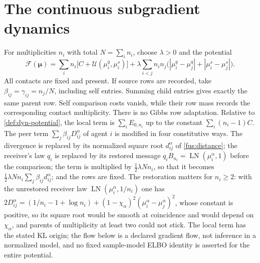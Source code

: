 \section{The continuous subgradient dynamics}
\label{sec:fus-dynamics}

For multiplicities $n_i$ with total $N=\sum_i n_i$, choose $\lambda>0$ and
the potential
\begin{equation}
 \mathcal F(\boldsymbol\mu)
 =\sum_i n_i\bigl[C+\mathcal U(\mu_i^q,\mu_i^s)\bigr]
 +\lambda\sum_{i<j}n_in_j
 \bigl(|\mu_i^q-\mu_j^q|+|\mu_i^s-\mu_j^s|\bigr).
 \label{fus:potential}
\end{equation}
All contacts are fixed and present. If source rows are recorded, take
$\beta_{ij}=\gamma_{ij}=n_j/N$, including self entries. Summing child
entries gives exactly the same parent row. Self comparison costs vanish,
while their row mass records the corresponding contact multiplicity.
There is no Gibbs row adaptation. Relative to \cref{def:dyn-potential},
the local term is $\sum_iE_{0,n_i}$ up to the constant $\sum_i(n_i-1)C$.
The peer term $\sum_j\beta_{ij}D_{ij}^\alpha$ of agent $i$ is modified in
four constitutive ways. The divergence is replaced by its normalized square
root $d_{ij}^\alpha$ of \cref{fus:distance}; the receiver's law $q_i$ is
replaced by its restored message $q_iB_{n_i}=\operatorname{LN}(\mu_i^\alpha,1)$
before the comparison; the term is multiplied by
$\tfrac12\lambda Nn_i$, so that it becomes
$\tfrac12\lambda Nn_i\sum_j\beta_{ij}d_{ij}^\alpha$; and the rows are fixed.
The restoration matters for $n_i\geq2$: with the unrestored receiver law
$\operatorname{LN}(\mu_i^\alpha,1/n_i)$ one has
$2D_{ij}^\alpha=(1/n_i-1+\log n_i)+(1-\chi_\alpha)^2(\mu_i^\alpha-\mu_j^\alpha)^2$,
whose constant is positive, so its square root would be smooth at
coincidence and would depend on $\chi_\alpha$, and parents of multiplicity at
least two could not stick. The local term has the stated KL origin; the flow
below is a declared gradient flow, not inference in a normalized model, and
no fixed sample-model ELBO identity is asserted for the entire potential.

